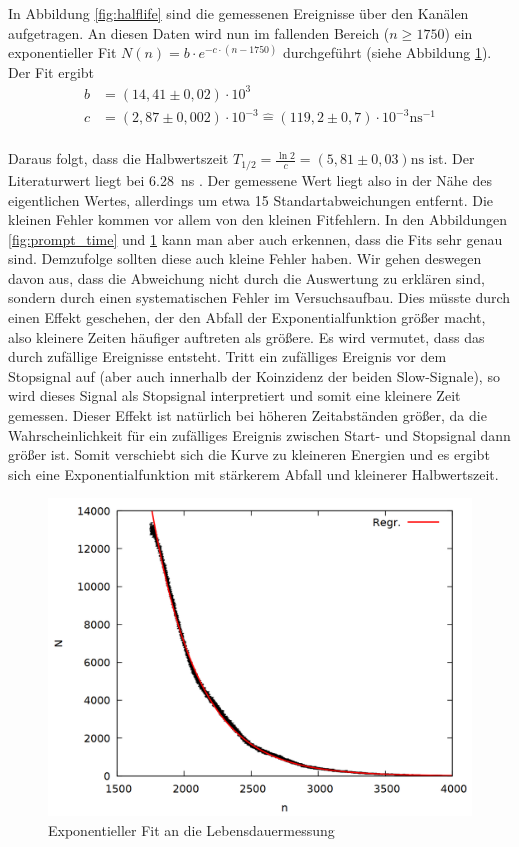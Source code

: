 In Abbildung \ref{fig:halflife} sind die gemessenen Ereignisse über den Kanälen aufgetragen. An diesen Daten wird nun im fallenden Bereich ($n \geq 1750$) ein exponentieller Fit $N(n)=b\cdot e^{-c\cdot (n-1750)}$ durchgeführt (siehe Abbildung \ref{fig:halflife2}). Der Fit ergibt
\begin{align*}
b &= (14,41 \pm 0,02) \cdot 10^3\\
c &= (2,87 \pm 0,002) \cdot 10^{-3} \mathrel{\widehat{=}} (119,2 \pm 0,7)\cdot 10^{-3} \si{\nano\second}^{-1}\\
\end{align*}

Daraus folgt, dass die Halbwertszeit $T_{1/2} = \frac{\ln{2}}{c} = (5,81 \pm 0,03) \si{\nano\second}$ ist. Der Literaturwert liegt bei \SI{6,28}{\nano\second} \cite{cs133}. Der gemessene Wert liegt also in der Nähe des eigentlichen Wertes, allerdings um etwa 15 Standartabweichungen entfernt. Die kleinen Fehler kommen vor allem von den kleinen Fitfehlern. In den Abbildungen \ref{fig:prompt_time} und \ref{fig:halflife2} kann man aber auch erkennen, dass die Fits sehr genau sind. Demzufolge sollten diese auch kleine Fehler haben. Wir gehen deswegen davon aus, dass die Abweichung nicht durch die Auswertung zu erklären sind, sondern durch einen systematischen Fehler im Versuchsaufbau. Dies müsste durch einen Effekt geschehen, der den Abfall der Exponentialfunktion größer macht, also kleinere Zeiten häufiger auftreten als größere. Es wird vermutet, dass das durch zufällige Ereignisse entsteht. Tritt ein zufälliges Ereignis vor dem Stopsignal auf (aber auch innerhalb der Koinzidenz der beiden Slow-Signale), so wird dieses Signal als Stopsignal interpretiert und somit eine kleinere Zeit gemessen. Dieser Effekt ist natürlich bei höheren Zeitabständen größer, da die Wahrscheinlichkeit für ein zufälliges Ereignis zwischen Start- und Stopsignal dann größer ist. Somit verschiebt sich die Kurve zu kleineren Energien und es ergibt sich eine Exponentialfunktion mit stärkerem Abfall und kleinerer Halbwertszeit. 

\begin{figure}[h]
\centering
\includegraphics[width=0.7\linewidth]{data/uebernacht2.png}
\caption{Exponentieller Fit an die Lebensdauermessung}
\label{fig:halflife2}
\end{figure}
